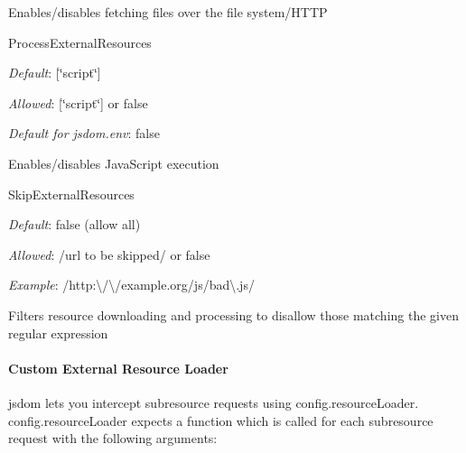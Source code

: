 Enables/disables fetching files over the file system/\+H\+T\+TP

{\ttfamily Process\+External\+Resources}


\begin{DoxyItemize}
\item {\itshape Default}\+: {\ttfamily \mbox{[}\char`\"{}script\char`\"{}\mbox{]}}
\item {\itshape Allowed}\+: {\ttfamily \mbox{[}\char`\"{}script\char`\"{}\mbox{]}} or {\ttfamily false}
\item {\itshape Default for {\ttfamily jsdom.\+env}}\+: {\ttfamily false}
\end{DoxyItemize}

Enables/disables Java\+Script execution

{\ttfamily Skip\+External\+Resources}


\begin{DoxyItemize}
\item {\itshape Default}\+: {\ttfamily false} (allow all)
\item {\itshape Allowed}\+: {\ttfamily /url to be skipped/} or {\ttfamily false}
\item {\itshape Example}\+: {\ttfamily /http\+:\textbackslash{}/\textbackslash{}/example.org/js/bad\textbackslash{}.js/}
\end{DoxyItemize}

Filters resource downloading and processing to disallow those matching the given regular expression

\paragraph*{Custom External Resource Loader}

jsdom lets you intercept subresource requests using {\ttfamily config.\+resource\+Loader}. {\ttfamily config.\+resource\+Loader} expects a function which is called for each subresource request with the following arguments\+:


